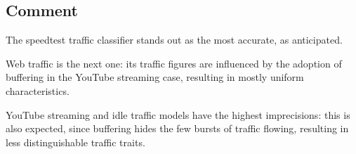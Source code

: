 \documentclass[a4paper,11pt]{article} %
\begin{document}
    \subsection{Comment}\label{subsec:comment}

    The speedtest traffic classifier stands out as the most accurate, as anticipated.

    \medskip

    Web traffic is the next one: its traffic figures are influenced by the adoption of buffering in the YouTube streaming case, resulting in mostly uniform characteristics.

    \medskip

    YouTube streaming and idle traffic models have the highest imprecisions: this is also expected, since buffering hides the few bursts of traffic flowing, resulting in less distinguishable traffic traits.
\end{document}
